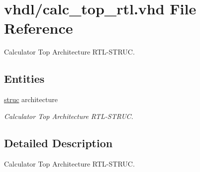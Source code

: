 \hypertarget{calc__top__rtl_8vhd}{}\section{vhdl/calc\+\_\+top\+\_\+rtl.vhd File Reference}
\label{calc__top__rtl_8vhd}


Calculator Top Architecture R\+T\+L-\/\+S\+T\+R\+UC.  


\subsection*{Entities}
\begin{DoxyCompactItemize}
\item 
\hyperlink{classcalc__top_1_1struc}{struc} architecture
\begin{DoxyCompactList}\small\item\em Calculator Top Architecture R\+T\+L-\/\+S\+T\+R\+UC. \end{DoxyCompactList}\end{DoxyCompactItemize}


\subsection{Detailed Description}
Calculator Top Architecture R\+T\+L-\/\+S\+T\+R\+UC. 

